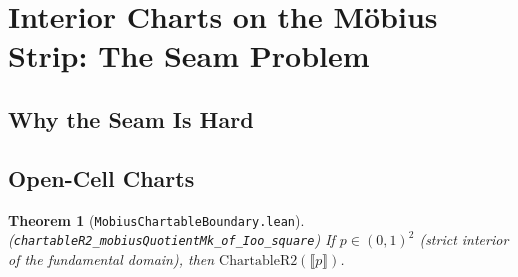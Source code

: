 \documentclass[11pt]{article}
\newtheorem{theorem}{Theorem}[section]
\newcommand{\leanref}[1]{\texttt{\small #1}}
\begin{document}

\section{Interior Charts on the M\"obius Strip: The Seam Problem}
\label{sec:seam}


\subsection{Why the Seam Is Hard}
\label{sec:seam-why}


\subsection{Open-Cell Charts}

\begin{theorem}[\leanref{MobiusChartableBoundary.lean}]
\label{thm:open-cell}
(\leanref{chartableR2\_mobiusQuotientMk\_of\_Ioo\_square})
If $p \in (0,1)^2$ (strict interior of the fundamental domain), then $\mathrm{ChartableR2}(\llbracket p \rrbracket)$.
\end{theorem}

\end{document}
